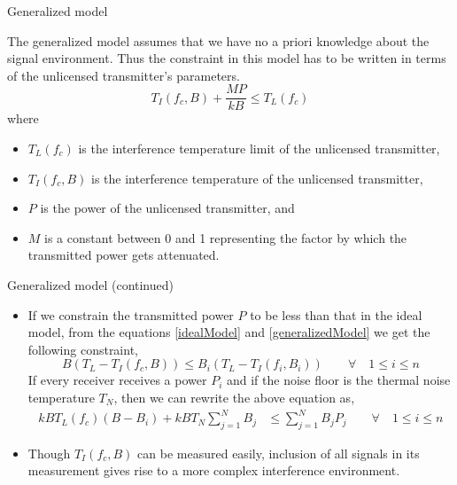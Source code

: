 \documentclass[mathserif]{beamer}
\begin{document}
\begin{frame}{Generalized model}

The generalized model assumes that we have no a priori knowledge about the signal environment. Thus the constraint in this model has to be written in terms of the unlicensed transmitter's parameters.
\begin{equation}
    T_I(f_c,B) + \frac{MP}{kB} \leq T_L(f_c) \label{generalizedModel}
\end{equation}
where
\pause
\begin{itemize}
	\item $T_L(f_c)$ is the interference temperature limit of the unlicensed transmitter,
	\item $T_I(f_c,B)$ is the interference temperature of the unlicensed transmitter, 
	\item $P$ is the power of the unlicensed transmitter, and
	\item $M$ is a constant between 0 and 1 representing the factor by which the transmitted power gets attenuated.
\end{itemize}

\end{frame}


\begin{frame}{Generalized model (continued)}

\begin{itemize}
\item If we constrain the transmitted power $P$ to be less than that in the ideal model, from the equations \eqref{idealModel} and \eqref{generalizedModel} we get the following constraint,
\begin{equation*}
    B(T_L - T_I(f_c,B)) \leq  B_i(T_L - T_I(f_i,B_i)) \qquad \forall \quad 1 \leq i \leq n \label{powerCompare}
\end{equation*}
If every receiver receives a power $P_i$ and if the noise floor is the thermal noise temperature $T_N$, then we can rewrite the above equation as,
\begin{align*}
    kBT_L(f_c)(B-B_i) + kBT_N\sum_{j=1}^{N}B_j & \leq \sum_{j=1}^{N}B_jP_j \qquad \forall \quad 1 \leq i\leq n
\end{align*}

\pause
\item
Though $T_I(f_c,B)$ can be measured easily, inclusion of all signals in its measurement gives rise to a more complex interference environment.

\end{itemize}

\end{frame}
\end{document}
